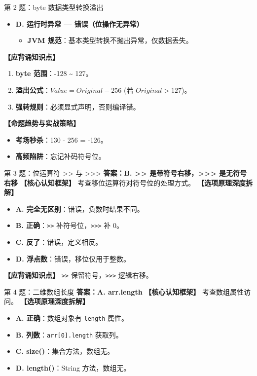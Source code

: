 ﻿\documentclass[12pt, a4paper]{ctexart}
\begin{document}
\begin{bluebox}{第 2 题：byte 数据类型转换溢出}
\begin{itemize}[leftmargin=*, nosep]
		\item \textbf{D. 运行时异常 — 错误（位操作无异常）}
		      \begin{itemize}[leftmargin=*, nosep]
			      \item \textbf{JVM 规范}：基本类型转换不抛出异常，仅数据丢失。
		      \end{itemize}
	\end{itemize}

	\textbf{【应背诵知识点】}
	\begin{enumerate}[leftmargin=*, nosep]
		\item \textbf{byte 范围}：-128 \textasciitilde{} 127。
		\item \textbf{溢出公式}：$Value = Original - 256$ (若 $Original > 127$)。
		\item \textbf{强转规则}：必须显式声明，否则编译错。
	\end{enumerate}

	\textbf{【命题趋势与实战策略】}
	\begin{itemize}[leftmargin=*, nosep]
		\item \textbf{考场秒杀}：130 - 256 = -126。
		\item \textbf{高频陷阱}：忘记补码符号位。
	\end{itemize}
\end{bluebox}

\begin{bluebox}{第 3 题：位运算符 >> 与 >>>}
	\textbf{答案：B. >> 是带符号右移，>>> 是无符号右移}
	\textbf{【核心认知框架】} 考查移位运算符对符号位的处理方式。
	\textbf{【选项原理深度拆解】}
	\begin{itemize}[leftmargin=*, nosep]
		\item \textbf{A. 完全无区别}：错误，负数时结果不同。
		\item \textbf{B. 正确}：\texttt{>>} 补符号位，\texttt{>>>} 补 0。
		\item \textbf{C. 反了}：错误，定义相反。
		\item \textbf{D. 浮点数}：错误，移位仅用于整数。
	\end{itemize}
	\textbf{【应背诵知识点】} \texttt{>>} 保留符号，\texttt{>>>} 逻辑右移。
\end{bluebox}

\begin{bluebox}{第 4 题：二维数组长度}
	\textbf{答案：A. arr.length}
	\textbf{【核心认知框架】} 考查数组属性访问。
	\textbf{【选项原理深度拆解】}
	\begin{itemize}[leftmargin=*, nosep]
		\item \textbf{A. 正确}：数组对象有 \texttt{length} 属性。
		\item \textbf{B. 列数}：\texttt{arr[0].length} 获取列。
		\item \textbf{C. size()}：集合方法，数组无。
		\item \textbf{D. length()}：String 方法，数组无。
	\end{itemize}
\end{bluebox}
\end{document}

